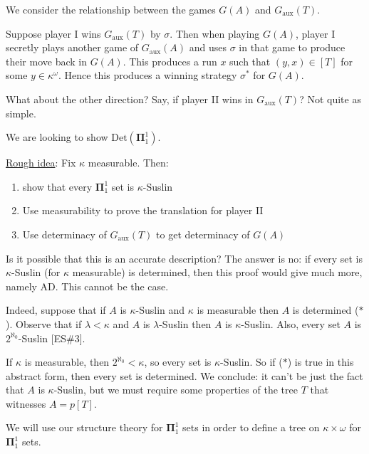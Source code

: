\documentclass[]{article}
\newcommand{\om}{\omega}
\newcommand{\bopi}{\bm{\Pi}}
\newcommand{\Det}{\textrm{Det}}
\newcommand{\aux}{\textrm{aux}}
\begin{document}
We consider the relationship between the games $G(A)$ and $G_\aux(T)$.

Suppose player I wins $G_\aux(T)$ by $\sigma$. Then when playing $G(A)$, player I secretly plays another game of $G_\aux(A)$ and uses $\sigma$ in that game to produce their move back in $G(A)$. This produces a run $x$ such that $(y,x) \in [T]$ for some $y\in \kappa^\om$. Hence this produces a winning strategy $\sigma^\ast$ for $G(A)$.

What about the other direction? Say, if player II wins in $G_\aux(T)$? Not quite as simple.


We are looking to show $\Det(\bopi^1_1)$.

\underline{Rough idea}: Fix $\kappa$ measurable. Then:
\begin{enumerate}[label = (\alph*)]
    \item show that every $\bopi^1_1$ set is $\kappa$-Suslin
    \item Use measurability to prove the translation for player II
    \item Use determinacy of $G_\aux (T)$ to get determinacy of $G(A)$
\end{enumerate}
Is it possible that this is an accurate description? The answer is no: if every set is $\kappa$-Suslin (for $\kappa$ measurable) is determined, then this proof would give much more, namely AD. This cannot be the case.

Indeed, suppose that if $A$ is $\kappa$-Suslin and $\kappa$ is measurable then $A$ is determined ($\ast$). Observe that if $\lambda < \kappa$ and $A$ is $\lambda$-Suslin then $A$ is $\kappa$-Suslin. Also, every set $A$ is $2^{\aleph_0}$-Suslin [ES\#3].

If $\kappa$ is measurable, then $2^{\aleph_0} < \kappa$, so every set is $\kappa$-Suslin. So if ($\ast$) is true in this abstract form, then every set is determined. We conclude: it can't be just the fact that $A$ is $\kappa$-Suslin, but we must require some properties of the tree $T$ that witnesses $A = p[T]$.

We will use our structure theory for $\bopi^1_1$ sets in order to define a tree on $\kappa\times \omega$ for $\bopi^1_1$ sets.
\end{document}
